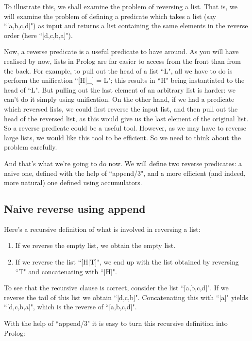 To illustrate this, we shall examine the problem of reversing a list.
That is, we will examine the problem of defining a predicate which
takes a list (say ``[a,b,c,d]") as input and returns a list
containing the same elements in the reverse order (here
``[d,c,b,a]").

Now, a reverse predicate is a useful predicate to have around. As you
will have realised by now, lists in Prolog are far easier to access
from the front than from the back. For example, to pull out the head
of a list ``L", all we have to do is perform the unification
``[H|\_] = L"; this results in ``H" being instantiated to the head of ``L". But
pulling out the last element of an arbitrary list is harder: we can't
do it simply using unification.  On the other hand, if we had a
predicate which reversed lists, we could first reverse the input list,
and then pull out the head of the reversed list, as this would give us
the last element of the original list.  So a reverse predicate could
be a useful tool.  However, as we may have to reverse large lists, we
would like this tool to be efficient.  So we need to think about the
problem carefully.

And that's what we're going to do now.  We will define two reverse
predicates: a naive one, defined with the help of ``append/3", and a
more efficient (and indeed, more natural) one defined using
accumulators.

\subsection*{Naive reverse using append}\label{SUBSEC.L6.REVERSE.NAIVE}



Here's a recursive definition of what is involved in reversing a list:

\begin{enumerate}
\item{}If we reverse the empty list, we obtain the
        empty list.
\item{}If we reverse the list ``[H|T]", we end up with the list
        obtained by reversing ``T" and concatenating with ``[H]".
\end{enumerate}
To see that the recursive clause is correct, consider the list
``[a,b,c,d]".  If we reverse the tail of this list we obtain
``[d,c,b]".  Concatenating this with ``[a]" yields
``[d,c,b,a]", which is the reverse of ``[a,b,c,d]".

With the help of ``append/3" it is easy to turn this recursive
definition into Prolog:

